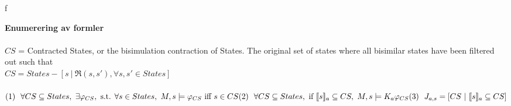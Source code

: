 \documentclass[11pt,a4paper,twosided]{article}
\begin{document}
f

\textbf{Enumerering av formler}\\\\
$CS$ = Contracted States, or the bisimulation contraction of States. The original set of states where all bisimilar states have been filtered out such that \\
$CS = States - [s \ |\ \mathfrak{R}(s,s'), \forall s,s' \in States]$ \\
\\
\begin{math}
(1) \ \ \forall CS \subseteq States, \ \exists\varphi_{CS}, \text{ s.t. } \forall s \in States, \ M,s \models \varphi_{CS} \text{ iff } s \in CS \\
(2) \ \ \forall CS \subseteq States, \text{ if } \llbracket s \rrbracket _a \subseteq CS, \ M,s \models K_a\varphi_{CS} \\
(3) \ \ J_{a,s} = [CS\ | \ \llbracket s \rrbracket _a \subseteq CS] \\
\end{math}
\end{document}
